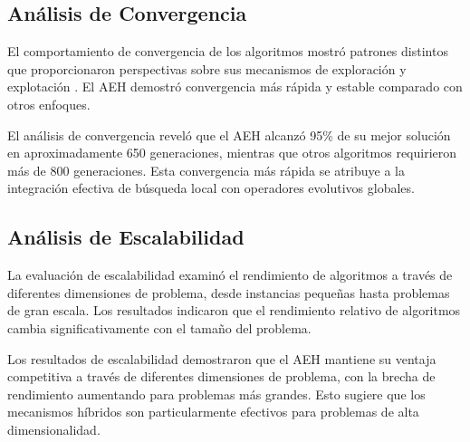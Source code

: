 \documentclass[conference]{IEEEtran}
\begin{document}
\subsection{Análisis de Convergencia}

El comportamiento de convergencia de los algoritmos mostró patrones distintos que proporcionaron perspectivas sobre sus mecanismos de exploración y explotación . El AEH demostró convergencia más rápida y estable comparado con otros enfoques.

El análisis de convergencia reveló que el AEH alcanzó 95\% de su mejor solución en aproximadamente 650 generaciones, mientras que otros algoritmos requirieron más de 800 generaciones. Esta convergencia más rápida se atribuye a la integración efectiva de búsqueda local con operadores evolutivos globales.

\subsection{Análisis de Escalabilidad}

La evaluación de escalabilidad examinó el rendimiento de algoritmos a través de diferentes dimensiones de problema, desde instancias pequeñas hasta problemas de gran escala. Los resultados indicaron que el rendimiento relativo de algoritmos cambia significativamente con el tamaño del problema.

\begin{table}[H]
\centering
\caption{Análisis de Escalabilidad por Dimensión de Problema}
\label{tab:scalability}
\end{table}

Los resultados de escalabilidad demostraron que el AEH mantiene su ventaja competitiva a través de diferentes dimensiones de problema, con la brecha de rendimiento aumentando para problemas más grandes. Esto sugiere que los mecanismos híbridos son particularmente efectivos para problemas de alta dimensionalidad.
\end{document}
